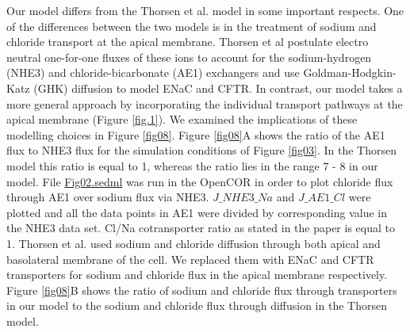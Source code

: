 \documentclass[fleqn,10pt]{physiome}
\begin{document}
Our model differs from the Thorsen et al. model \citep{thorsen2014transepithelial} in some
important respects. One of the differences between the two models is in the
treatment of sodium and chloride transport at the apical membrane. Thorsen
et al postulate electro neutral one-for-one fluxes of these ions to account for the
sodium-hydrogen (NHE3) and chloride-bicarbonate (AE1) exchangers and use
Goldman-Hodgkin-Katz (GHK) diffusion to model ENaC and CFTR. In contrast,
our model takes a more general approach by incorporating the individual
transport pathways at the apical membrane (Figure \ref{fig.1}). We examined the
implications of these modelling choices in Figure \ref{fig08}. Figure \ref{fig08}A shows the
ratio of the AE1 flux to NHE3 flux for the simulation conditions of Figure \ref{fig03}.
In the Thorsen model this ratio is equal to 1, whereas the ratio lies in the range
7 - 8 in our model. File \href{https://models.physiomeproject.org/workspace/572/file/057757b3a8de9a56b4bd32b8a12a0f00af1d8213/SEDML_files/Fig02.sedml}{Fig02.sedml} was run in the OpenCOR in order to plot chloride flux through AE1 over sodium flux via NHE3. $J\_{NHE3}\_{Na}$ and $J\_{AE1}\_{Cl}$ were plotted and all the data points in AE1 were divided by corresponding value in the NHE3 data set. Cl/Na cotransporter ratio as stated in the paper is equal to 1. Thorsen et al. used sodium and chloride diffusion through both apical and basolateral membrane of the cell. We replaced them with ENaC and CFTR transporters for sodium and chloride flux in the apical membrane respectively. Figure \ref{fig08}B shows the ratio of sodium and chloride flux through transporters in our model to the sodium and chloride flux through diffusion in the Thorsen model.\newline
\end{document}
